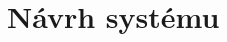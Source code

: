 \chapter{Návrh systému}
\label{sec:NavrhSystemu}

\iffalse
pragma pack
obrazek navrhu z prezentace
nasledna uprava obrazku
pouziti bpf python
\fi